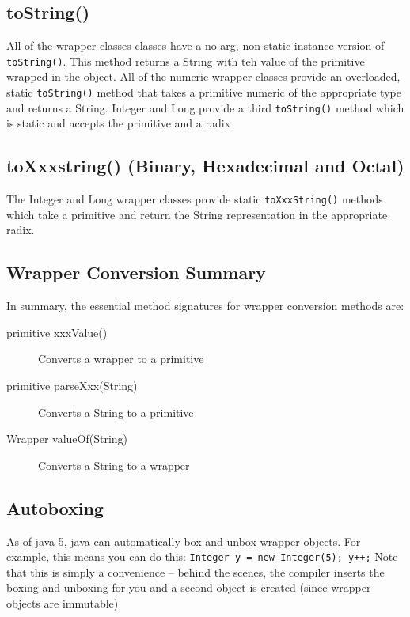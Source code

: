 \subsection{toString()}
All of the wrapper classes classes have a no-arg, non-static instance version 
of \verb#toString()#. This method returns a String with teh value of the 
primitive wrapped in the object. All of the numeric wrapper classes provide an 
overloaded, static \verb#toString()# method that takes a primitive numeric of 
the appropriate type and returns a String. Integer and Long provide a third 
\verb#toString()# method which is static and accepts the primitive and a radix

\subsection{toXxxstring() (Binary, Hexadecimal and Octal)}
The Integer and Long wrapper classes provide static \verb#toXxxString()# 
methods which take a primitive and return the String representation in the 
appropriate radix.

\subsection{Wrapper Conversion Summary}
In summary, the essential method signatures for wrapper conversion methods are:
\begin{description}
    \item[primitive xxxValue()] Converts a wrapper to a primitive
    \item[primitive parseXxx(String)] Converts a String to a primitive
    \item[Wrapper valueOf(String)] Converts a String to a wrapper
\end{description}

\subsection{Autoboxing}
As of java 5, java can automatically box and unbox wrapper objects. For 
example, this means you can do this: \verb#Integer y = new Integer(5); y++;# 
Note that this is simply a convenience -- behind the scenes, the compiler 
inserts the boxing and unboxing for you and a second object is created (since 
wrapper objects are immutable)

